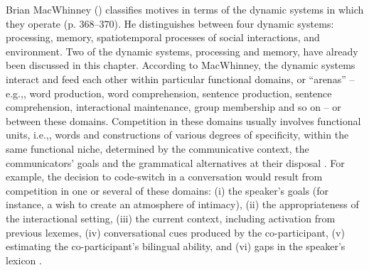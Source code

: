 Brian MacWhinney (\citeyear{macwhinney2014}) classifies motives in terms of the dynamic systems in which they operate (p. 368--370). He distinguishes between four dynamic systems: processing, memory, spatiotemporal processes of social interactions, and environment. Two of the dynamic systems, processing and memory, have already been discussed in this chapter. According to MacWhinney, the dynamic systems interact and feed each other within particular functional domains, or “arenas” -- e.g.,, word production, word comprehension, sentence production, sentence comprehension, interactional maintenance, group membership and so on -- or between these domains. Competition in these domains usually involves functional units, i.e.,, words and constructions of various degrees of specificity, within the same functional niche, determined by the communicative context, the communicators' goals and the grammatical alternatives at their disposal \citep{dubois2014}. For example, the decision to code-switch in a conversation would result from competition in one or several of these domains: ({i}) the speaker's goals (for instance, a wish to create an atmosphere of intimacy), ({ii}) the appropriateness of the interactional setting, ({iii}) the current context, including activation from previous lexemes, ({iv}) conversational cues produced by the co-participant, ({v}) estimating the co-participant's bilingual ability, and ({vi}) gaps in the speaker's lexicon \citep[cf.][72]{macwhinney2005}. 

